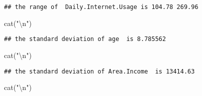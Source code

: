 \documentclass[
]{article}
\newenvironment{Shaded}{\begin{snugshade}}{\end{snugshade}}
\newcommand{\FunctionTok}[1]{\textcolor[rgb]{0.00,0.00,0.00}{#1}}
\newcommand{\NormalTok}[1]{#1}
\newcommand{\SpecialCharTok}[1]{\textcolor[rgb]{0.00,0.00,0.00}{#1}}
\newcommand{\StringTok}[1]{\textcolor[rgb]{0.31,0.60,0.02}{#1}}
\begin{document}
\begin{verbatim}
## the range of  Daily.Internet.Usage is 104.78 269.96
\end{verbatim}

\begin{Shaded}
\begin{Highlighting}[]
\FunctionTok{cat}\NormalTok{(}\StringTok{"}\SpecialCharTok{\textbackslash{}n}\StringTok{"}\NormalTok{)}
\end{Highlighting}
\end{Shaded}

\begin{Shaded}
\end{Shaded}

\begin{verbatim}
## the standard deviation of age  is 8.785562
\end{verbatim}

\begin{Shaded}
\begin{Highlighting}[]
\FunctionTok{cat}\NormalTok{(}\StringTok{"}\SpecialCharTok{\textbackslash{}n}\StringTok{"}\NormalTok{)}
\end{Highlighting}
\end{Shaded}

\begin{Shaded}
\end{Shaded}

\begin{verbatim}
## the standard deviation of Area.Income  is 13414.63
\end{verbatim}

\begin{Shaded}
\begin{Highlighting}[]
\FunctionTok{cat}\NormalTok{(}\StringTok{"}\SpecialCharTok{\textbackslash{}n}\StringTok{"}\NormalTok{)}
\end{Highlighting}
\end{Shaded}
\end{document}
